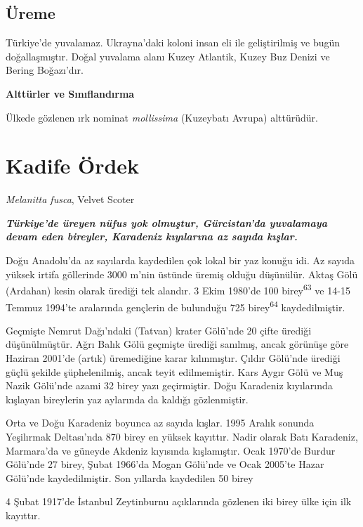 \documentclass[
  letterpaper,
  DIV=11,
  numbers=noendperiod]{scrreprt}
\begin{document}
\hypertarget{uxfcreme-26}{%
\subsection{\texorpdfstring{\textbf{Üreme}}{Üreme}}\label{uxfcreme-26}}

Türkiye'de yuvalamaz. Ukrayna'daki koloni insan eli ile geliştirilmiş ve
bugün doğallaşmıştır. Doğal yuvalama alanı Kuzey Atlantik, Kuzey Buz
Denizi ve Bering Boğazı'dır.

\textbf{Alttürler ve Sınıflandırma}

Ülkede gözlenen ırk nominat \emph{mollissima} (Kuzeybatı Avrupa)
alttürüdür.

\hypertarget{kadife-uxf6rdek}{%
\section{Kadife Ördek}\label{kadife-uxf6rdek}}

\emph{Melanitta fusca}, Velvet Scoter

\textbf{\emph{Türkiye'de üreyen nüfus yok olmuştur, Gürcistan'da
yuvalamaya devam eden bireyler, Karadeniz kıyılarına az sayıda kışlar.}}

Doğu Anadolu'da az sayılarda kaydedilen çok lokal bir yaz konuğu idi. Az
sayıda yüksek irtifa göllerinde 3000 m'nin üstünde üremiş olduğu
düşünülür. Aktaş Gölü (Ardahan) kesin olarak ürediği tek alandır. 3 Ekim
1980'de 100 birey\textsuperscript{63} ve 14-15 Temmuz 1994'te aralarında
gençlerin de bulunduğu 725 birey\textsuperscript{64} kaydedilmiştir.

Geçmişte Nemrut Dağı'ndaki (Tatvan) krater Gölü'nde 20 çifte ürediği
düşünülmüştür. Ağrı Balık Gölü geçmişte ürediği sanılmış, ancak görünüşe
göre Haziran 2001'de (artık) üremediğine karar kılınmıştır. Çıldır
Gölü'nde ürediği güçlü şekilde şüphelenilmiş, ancak teyit edilmemiştir.
Kars Aygır Gölü ve Muş Nazik Gölü'nde azami 32 birey yazı geçirmiştir.
Doğu Karadeniz kıyılarında kışlayan bireylerin yaz aylarında da kaldığı
gözlenmiştir.

Orta ve Doğu Karadeniz boyunca az sayıda kışlar. 1995 Aralık sonunda
Yeşilırmak Deltası'nda 870 birey en yüksek kayıttır. Nadir olarak Batı
Karadeniz, Marmara'da ve güneyde Akdeniz kıyısında kışlamıştır. Ocak
1970'de Burdur Gölü'nde 27 birey, Şubat 1966'da Mogan Gölü'nde ve Ocak
2005'te Hazar Gölü'nde kaydedilmiştir. Son yıllarda kaydedilen 50 birey

4 Şubat 1917'de İstanbul Zeytinburnu açıklarında gözlenen iki birey ülke
için ilk kayıttır.
\end{document}
